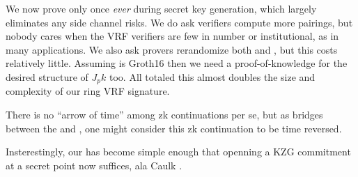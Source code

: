 We now prove \pisk only once {\it ever} during secret key generation,
which largely eliminates any side channel risks.
We do ask verifiers compute more pairings, but nobody cares when
the VRF verifiers are few in number or institutional,
 as in many applications.
We also ask provers rerandomize both \pisk and \pipk, but this costs relatively little.
Assuming \pipk is Groth16 then we need a proof-of-knowledge for the desired structure of $J_pk$ too.
All totaled this almost doubles the size and complexity of our ring VRF signature.

There is no ``arrow of time'' among zk continuations per se, but
as \pisk bridges between the \PedVRF and \pipk,
one might consider this zk continuation to be time reversed.

Insterestingly, our \pipk has become simple enough that openning
a KZG commitment \cite{KZG} at a secret point now suffices, ala Caulk \cite{Caulk}.


\endinput

